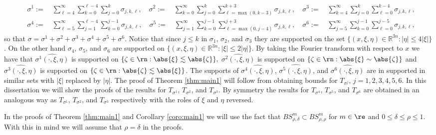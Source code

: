 \begin{align*}
& \sigma^1:= \quad \sum\limits_{\ell=4}^\infty \sum\limits_{k=0}^{\ell - 4} \sum\limits_{j =0}^{k} \sigma_{j,k,\ell}, \quad \sigma^2:= \quad \sum\limits_{k=0}^\infty \sum\limits_{j=0}^k \sum\limits_{\ell =\max(0,k-3)}^{k+3} \sigma_{j,k,\ell},\quad\sigma^3:= \quad \sum\limits_{k=4}^\infty \sum\limits_{j=0}^k \sum\limits_{\ell =0}^{k-4} \sigma_{j,k,\ell},\\
&\sigma^4:= \quad \sum\limits_{\ell=5}^\infty \sum\limits_{j=1}^{\ell - 4} \sum\limits_{k =0}^{j-1} \sigma_{j,k,\ell}, \quad \sigma^5:= \quad  \sum\limits_{j=1}^\infty \sum\limits_{k=0}^{j-1} \sum\limits_{\ell =\max(0,j-4)}^{j+3} \sigma_{j,k,\ell},\quad \sigma^6:= \quad \sum\limits_{j=5}^\infty \sum\limits_{k=0}^{j-1} \sum\limits_{\ell =0}^{j-5} \sigma_{j,k,\ell},
\end{align*}
so that $\sigma = \sigma^1+\sigma^2+\sigma^3+\sigma^4+\sigma^5+\sigma^6.$ Notice that since $j\leq k$ in $\sigma_1$, $\sigma_2$, and $\sigma_3$ they are supported on the set $\{(x,\xi,\eta) \in \mathbb{R}^{3n} : |\eta| \leq 4|\xi|\}$. On the other hand $\sigma_4$, $\sigma_5$, and $\sigma_6$ are supported on $\{(x,\xi,\eta) \in \mathbb{R}^{3n} : |\xi| \leq 2|\eta|\}$. By taking the Fourier transform with respect to $x$ we have that $\widehat{\sigma^1(\cdot,\xi,\eta)}$ is supported on $\{\zeta\in\rn: \abs{\xi}\lesssim \abs{\zeta}\},$
$\widehat{\sigma^2(\cdot,\xi,\eta)}$ is supported on $\{\zeta\in\rn: \abs{\xi}\sim \abs{\zeta}\}$ and $\widehat{\sigma^3(\cdot,\xi,\eta)}$ is supported on $\{\zeta\in\rn: \abs{\zeta}\lesssim \abs{\xi}\}$. The supports of $\widehat{\sigma^4(\cdot,\xi,\eta)}$, $\widehat{\sigma^5(\cdot,\xi,\eta)}$, and $\widehat{\sigma^6(\cdot,\xi,\eta)}$ are in supported in similar sets with $|\xi|$ replaced by $|\eta|$. The proof of Theorem \ref{thm:main1} will follow from obtaining bounds for $T_{\sigma^j}$, $j=1,2,3,4,5,6$. In this dissertation we will show the proofs of the results for $T_{\sigma^1}$, $T_{\sigma^2}$, and $T_{\sigma^3}$. By symmetry the results for $T_{\sigma^4}$, $T_{\sigma^5}$, and $T_{\sigma^6}$ are obtained in an analogous way as $T_{\sigma^1}$, $T_{\sigma^2}$, and $T_{\sigma^3}$ respectively with the roles of $\xi$ and $\eta$ reversed.

In the proofs of Theorem \ref{thm:main1} and Corollary \ref{coro:main1} we will use the fact that $BS^m_{\rho,\delta}\subset BS^m_{\rho,\rho}$ for $m\in\re$ and $0\le \delta\le \rho\le 1$. With this in mind we will assume that $\rho = \delta$ in the proofs.

